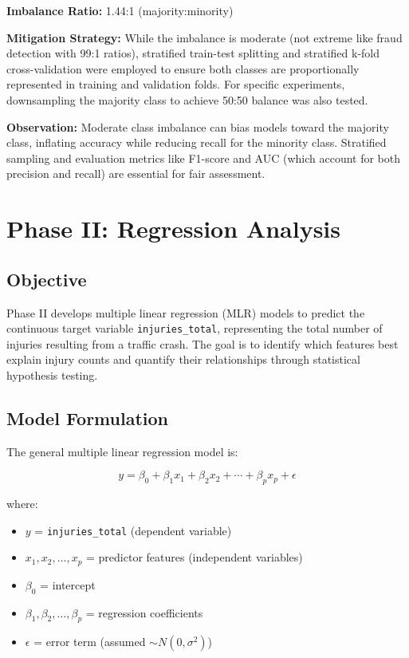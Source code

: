 \documentclass[12pt,man]{apa7}
\begin{document}
\textbf{Imbalance Ratio:} 1.44:1 (majority:minority)

\textbf{Mitigation Strategy:} While the imbalance is moderate (not extreme like fraud detection with 99:1 ratios), stratified train-test splitting and stratified k-fold cross-validation were employed to ensure both classes are proportionally represented in training and validation folds. For specific experiments, downsampling the majority class to achieve 50:50 balance was also tested.

\textbf{Observation:} Moderate class imbalance can bias models toward the majority class, inflating accuracy while reducing recall for the minority class. Stratified sampling and evaluation metrics like F1-score and AUC (which account for both precision and recall) are essential for fair assessment.

\section{Phase II: Regression Analysis}

\subsection{Objective}

Phase II develops multiple linear regression (MLR) models to predict the continuous target variable \texttt{injuries\_total}, representing the total number of injuries resulting from a traffic crash. The goal is to identify which features best explain injury counts and quantify their relationships through statistical hypothesis testing.

\subsection{Model Formulation}

The general multiple linear regression model is:

\begin{equation}
y = \beta_0 + \beta_1 x_1 + \beta_2 x_2 + \cdots + \beta_p x_p + \epsilon
\end{equation}

where:
\begin{itemize}
    \item $y$ = \texttt{injuries\_total} (dependent variable)
    \item $x_1, x_2, \ldots, x_p$ = predictor features (independent variables)
    \item $\beta_0$ = intercept
    \item $\beta_1, \beta_2, \ldots, \beta_p$ = regression coefficients
    \item $\epsilon$ = error term (assumed $\sim N(0, \sigma^2)$)
\end{itemize}
\end{document}
